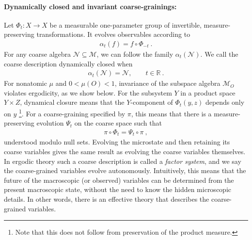 \documentclass[a4paper,11pt]{article}
\theoremstyle{definition}
\newcommand{\mN}{\mathcal{N}}
\newcommand{\mM}{\mathcal{M}}
\begin{document}
\paragraph{Dynamically closed and invariant coarse-grainings:}
Let $\Phi_t:X\to X$ be a measurable one-parameter group of invertible, measure-preserving transformations. It evolves observables according to
\begin{align}
    \alpha_t(f)=f\circ\Phi_{-t}\ .
\end{align}
For any coarse algebra $\mN\subseteq\mM$, we can follow the family $\alpha_t(\mN)$. We call the coarse description dynamically closed when
\begin{align}\label{eq:classical-coarse-invariance}
    \alpha_t(\mN)=\mN,\qquad t\in\mathbb R\ .
\end{align}
For nonatomic $\mu$ and $0<\mu(O)<1$, invariance of the subspace algebra $\mM_O$ violates ergodicity, as we show below.
For the subsystem $Y$ in a product space $Y\times Z$, dynamical closure means that the $Y$-component of $\Phi_t(y,z)$ depends only on $y$ \footnote{Note that this does not follow from preservation of the product measure.}. For a coarse-graining specified by $\pi$, this means that there is a measure-preserving evolution $\Psi_t$ on the coarse space such that
\begin{align}\label{eq:classical-factor-intertwining}
    \pi\circ\Phi_t=\Psi_t\circ\pi\ ,
\end{align}
understood modulo null sets. Evolving the microstate and then retaining its coarse variables gives the same result as evolving the coarse variables themselves. In ergodic theory such a coarse description is called a {\it factor system}, and we say the coarse-grained variables evolve autonomously. Intuitively, this means that the future of the macroscopic (or observed) variables can be determined from the present macroscopic state, without the need to know the hidden microscopic details. In other words, there is an effective theory that describes the coarse-grained variables.


\end{document}
